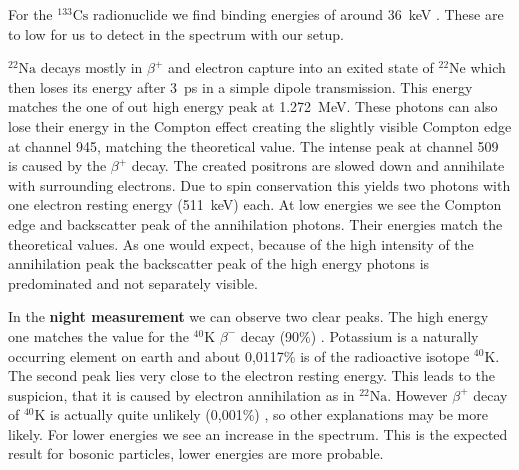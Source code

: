 For the $^{133}\text{Cs}$ radionuclide we find binding energies of around \SI{36}{\kilo\electronvolt} \cite{KayeLaby}.
These are to low for us to detect in the spectrum with our setup.
%
\par
\textbf{$^{22}\text{Na}$} decays mostly in $\beta^{+}$ and electron capture into an exited state of $^{22}\text{Ne}$ which then loses its energy after \SI{3}{\pico\second} in a simple dipole transmission.
This energy matches the one of out high energy peak at \SI{1.272}{\mega\electronvolt}.
These photons can also lose their energy in the Compton effect creating the slightly visible Compton edge at channel 945, matching the theoretical value.
The intense peak at channel 509 is caused by the $\beta^{+}$ decay.
The created positrons are slowed down and annihilate with surrounding electrons.
Due to spin conservation this yields two photons with one electron resting energy (\SI{511}{\kilo\electronvolt}) each.
At low energies we see the Compton edge and backscatter peak of the annihilation photons.
Their energies match the theoretical values.
As one would expect, because of the high intensity of the annihilation peak the backscatter peak of the high energy photons is predominated and not separately visible.
%
\par
In the \textbf{night measurement} we can observe two clear peaks.
The high energy one matches the value for the $^{40}\text{K}$ $\beta^{-}$ decay (90\%) \cite{WikiPotassium}.
Potassium is a naturally occurring element on earth and about 0,0117\% is of the radioactive isotope $^{40}\text{K}$.
The second peak lies very close to the electron resting energy.
This leads to the suspicion, that it is caused by electron annihilation as in $^{22}\text{Na}$.
However $\beta^{+}$ decay of $^{40}\text{K}$ is actually quite unlikely (0,001\%) \cite{WikiPotassium}, so other explanations may be more likely.
For lower energies we see an increase in the spectrum.
This is the expected result for bosonic particles, lower energies are more probable.
%
